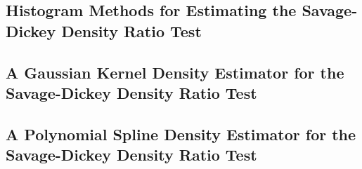 \subsection{Histogram Methods for Estimating the Savage-Dickey Density Ratio Test}
\subsection{A Gaussian Kernel Density Estimator for the Savage-Dickey Density Ratio Test}
\subsection{A Polynomial Spline Density Estimator for the Savage-Dickey Density Ratio Test}
